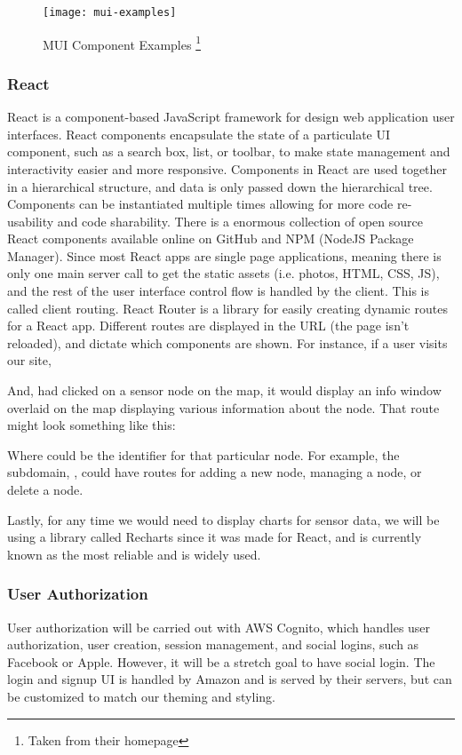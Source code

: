 \begin{figure}
  \centering
  \texttt{[image: mui-examples]}
  \caption{MUI Component Examples \footnote{Taken from their homepage}}
  \label{fig:mui-example-components} 
\end{figure}

\subsubsection{React}
React is a component-based JavaScript framework for design web application user interfaces. React
components encapsulate the state of a particulate UI component, such as a search box, list, or
toolbar, to make state management and interactivity easier and more responsive. Components in React
are used together in a hierarchical structure, and data is only passed down the hierarchical tree.
Components can be instantiated multiple times allowing for more code re-usability and code
sharability. There is a enormous collection of open source React components available online on
GitHub and NPM (NodeJS Package Manager). Since most React apps are single page applications, meaning
there is only one main server call to get the static assets (i.e. photos, HTML, CSS, JS), and the
rest of the user interface control flow is handled by the client. This is called client routing.
React Router is a library for easily creating dynamic routes for a React app. Different routes are
displayed in the URL (the page isn't reloaded), and dictate which components are shown. For
instance, if a user visits our site,


And, had clicked on a sensor node on the map, it would display an info window
overlaid on the map displaying various information about the node. That route might look something
like this:


Where  could be the identifier for that particular node. For example, the subdomain,
, could have routes for adding a new node, managing a node, or delete a node.

Lastly, for any time we would need to display charts for sensor data, we will be using a library
called Recharts since it was made for React, and is currently known as the most reliable and is
widely used.


\subsubsection{User Authorization}
User authorization will be carried out with AWS Cognito, which handles user authorization, user
creation, session management, and social logins, such as Facebook or Apple. However, it will be
a stretch goal to have social login. The login and signup UI is handled by Amazon and is served by
their servers, but can be customized to match our theming and styling.

